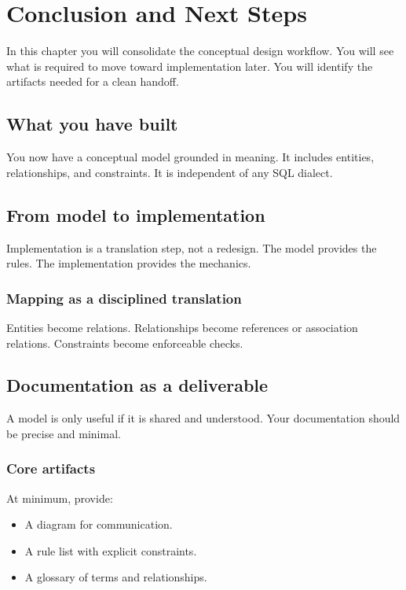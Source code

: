 \chapter{Conclusion and Next Steps}

\begin{learningobjectives}
In this chapter you will consolidate the conceptual design workflow.
You will see what is required to move toward implementation later.
You will identify the artifacts needed for a clean handoff.
\end{learningobjectives}

\section{What you have built}
You now have a conceptual model grounded in meaning.
It includes entities, relationships, and constraints.
It is independent of any SQL dialect.

\section{From model to implementation}
Implementation is a translation step, not a redesign.
The model provides the rules.
The implementation provides the mechanics.

\subsection{Mapping as a disciplined translation}
Entities become relations.
Relationships become references or association relations.
Constraints become enforceable checks.

\section{Documentation as a deliverable}
A model is only useful if it is shared and understood.
Your documentation should be precise and minimal.

\subsection{Core artifacts}
At minimum, provide:
\begin{itemize}
  \item A diagram for communication.
  \item A rule list with explicit constraints.
  \item A glossary of terms and relationships.
\end{itemize}

